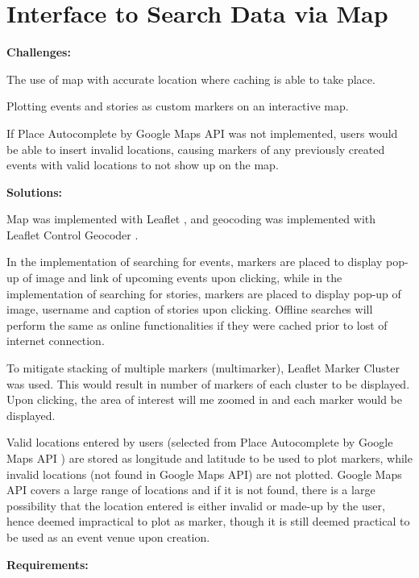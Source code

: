 \documentclass[11pt, a4paper]{article}
\begin{document}
\section{Interface to Search Data via Map}
\textbf{Challenges:}
\begin{enumerate*}[label=\textbf{\arabic*})]
\item The use of map with accurate location where caching is able to take place.
\item Plotting events and stories as custom markers on an interactive map.
\item If Place Autocomplete by Google Maps API \cite{google_maps_api} was not implemented, users
would be able to insert invalid locations, causing markers of any previously created events with
valid locations to not show up on the map.
\end{enumerate*}
%
\textbf{Solutions:}
\begin{enumerate*}[label=\textbf{\arabic*})]
\item Map was implemented with Leaflet \cite{leaflet}, and geocoding was implemented with
Leaflet Control Geocoder \cite{leaflet_geocoder}.
\item In the implementation of searching for events, markers are placed to display pop-up of image
and link of upcoming events upon clicking, while in the implementation of searching for stories,
markers are placed to display pop-up of image, username and caption of stories upon clicking.
Offline searches will perform the same as online functionalities if they were cached prior to lost
of internet connection.
\item To mitigate stacking of multiple markers (multimarker), Leaflet Marker Cluster
\cite{leaflet_marker_cluster} was used. This would result in number of markers of each cluster to be
displayed. Upon clicking, the area of interest will me zoomed in and each marker would be displayed.
\item Valid locations entered by users (selected from Place Autocomplete by Google Maps API
\cite{google_maps_api}) are stored as longitude and latitude to be used to plot markers, while
invalid locations (not found in Google Maps API) are not plotted. Google Maps API covers a large
range of locations and if it is not found, there is a large possibility that the location entered is
either invalid or made-up by the user, hence deemed impractical to plot as marker, though it is still
deemed practical to be used as an event venue upon creation.
\end{enumerate*}
%
\textbf{Requirements:}
\end{document}
